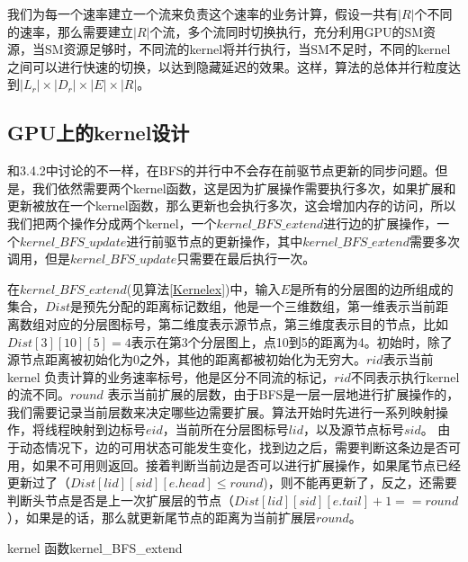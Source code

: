 我们为每一个速率建立一个流来负责这个速率的业务计算，假设一共有$|R|$个不同的速率，那么需要建立$|R|$个流，多个流同时切换执行，充分利用GPU的SM资源，当SM资源足够时，不同流的kernel将并行执行，当SM不足时，不同的kernel之间可以进行快速的切换，以达到隐藏延迟的效果。这样，算法的总体并行粒度达到$|L_r|\times|D_r|\times|E|\times|R|$。

\subsection{GPU上的kernel设计}
和3.4.2中讨论的不一样，在BFS的并行中不会存在前驱节点更新的同步问题。但是，我们依然需要两个kernel函数，这是因为扩展操作需要执行多次，如果扩展和更新被放在一个kernel函数，那么更新也会执行多次，这会增加内存的访问，所以我们把两个操作分成两个kernel，一个$kernel\_BFS\_extend$进行边的扩展操作，一个$kernel\_BFS\_update$进行前驱节点的更新操作，其中$kernel\_BFS\_extend$需要多次调用，但是$kernel\_BFS\_update$只需要在最后执行一次。

在$kernel\_BFS\_extend$(见算法\ref{Kernelex})中，输入$E$是所有的分层图的边所组成的集合，$Dist$是预先分配的距离标记数组，他是一个三维数组，第一维表示当前距离数组对应的分层图标号，第二维度表示源节点，第三维度表示目的节点，比如$Dist[3][10][5]=4$表示在第3个分层图上，点10到5的距离为4。初始时，除了源节点距离被初始化为0之外，其他的距离都被初始化为无穷大。$rid$表示当前kernel 负责计算的业务速率标号，他是区分不同流的标记，$rid$不同表示执行kernel的流不同。$round$ 表示当前扩展的层数，由于BFS是一层一层地进行扩展操作的，我们需要记录当前层数来决定哪些边需要扩展。算法开始时先进行一系列映射操作，将线程映射到边标号$eid$，当前所在分层图标号$lid$，以及源节点标号$sid$。 由于动态情况下，边的可用状态可能发生变化，找到边之后，需要判断这条边是否可用，如果不可用则返回。接着判断当前边是否可以进行扩展操作，如果尾节点已经更新过了（$Dist[lid][sid][e.head] \le round$)，则不能再更新了，反之，还需要判断头节点是否是上一次扩展层的节点（$Dist[lid][sid][e.tail]+1==round$），如果是的话，那么就更新尾节点的距离为当前扩展层$round$。
\begin{algorithm}[t]
\begin{algorithmic}[1]
\EndIf
{}
\EndIf
\EndFunction
\end{algorithmic}
\caption{kernel 函数kernel\_BFS\_extend}
\label{Kernelex}
\end{algorithm}


